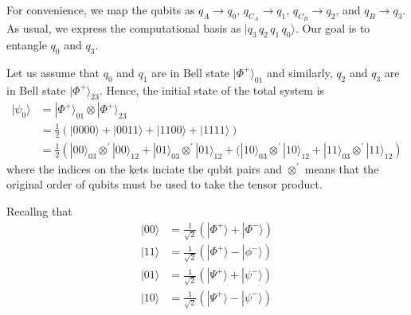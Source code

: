 \documentclass[letterpaper,10pt,english]{jupyterBook}
\begin{document}
\sphinxAtStartPar
For convenience, we map the qubits as \(q_A \rightarrow q_0\), \(q_{C_A} \rightarrow q_1\), \(q_{C_B} \rightarrow q_2\), and \(q_{B} \rightarrow q_3\). As usual, we express the computational basis as \(|q_3\,q_2\,q_1\,q_0\rangle\).  Our goal is to entangle \(q_0\) and \(q_3\).

\sphinxAtStartPar
Let us assume that \(q_0\) and \(q_1\) are in  Bell state \(|\Phi^{+}\rangle_{01}\) and similarly, \(q_2\) and \(q_3\) are in  Bell state \(|\Phi^{+}\rangle_{23}\).  Hence, the initial state of the total system is
\begin{align}
|\psi_0\rangle &= |\Phi^{+}\rangle_{01} \otimes |\Phi^{+}\rangle_{23} \\
&=\frac{1}{2} \left (|0000\rangle + |0011\rangle + |1100\rangle + |1111\rangle\right) \\
&=\frac{1}{2} \left (|00\rangle_{03} \otimes^\prime |00\rangle_{12} + |01\rangle_{03} \otimes^\prime |01\rangle_{12} +
(|10\rangle_{03} \otimes^\prime |10\rangle_{12} + |11\rangle_{03} \otimes^\prime |11\rangle_{12} \right)\label{equation:algorithms/entanglement-swap:psi0-ABC}
\end{align}
\sphinxAtStartPar
where the indices on the kets inciate the qubit pairs and \(\otimes^\prime\) means that the original order of qubits must be used to take the tensor product.

\sphinxAtStartPar
Recallng that
\begin{align}
|00\rangle &= \frac{1}{\sqrt{2}} \left(|\Phi^{+}\rangle + |\Phi^{-}\rangle \right) \\
|11\rangle &= \frac{1}{\sqrt{2}} \left(|\Phi^{+}\rangle - |\phi^{-}\rangle \right) \\
|01\rangle &= \frac{1}{\sqrt{2}} \left(|\Psi^{+}\rangle + |\psi^{-}\rangle \right) \\
|10\rangle &= \frac{1}{\sqrt{2}} \left(|\Psi^{+}\rangle - |\psi^{-}\rangle \right)\label{equation:algorithms/entanglement-swap:bell-cbase}
\end{align}
\end{document}
